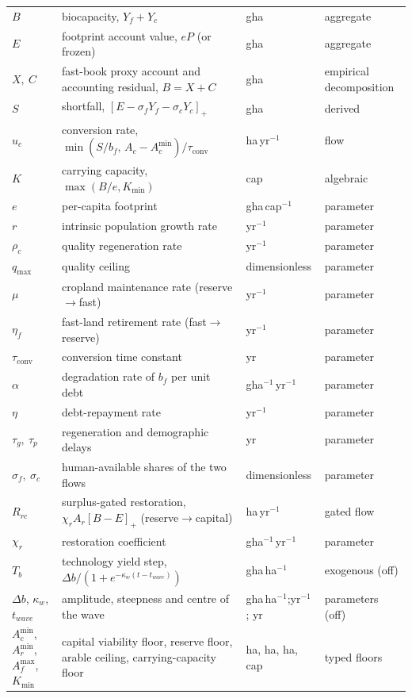 \documentclass[11pt,a4paper]{article}
\newcommand{\pos}[1]{\left[#1\right]_+}
\newcommand{\Acmin}{A_c^{\min}}
\newcommand{\tconv}{\tau_{\mathrm{conv}}}
\begin{document}
\begin{longtable}{>{\raggedright\arraybackslash}p{}>{\raggedright\arraybackslash}p{}>{\raggedright\arraybackslash}p{}>{\raggedright\arraybackslash}p{}}
$B$ & biocapacity, $Y_f+Y_c$ & gha & aggregate \\
$E$ & footprint account value, $eP$ (or frozen) & gha & aggregate \\
$X,\ C$ & fast-book proxy account and accounting residual, $B=X+C$ & gha & empirical decomposition \\
$S$ & shortfall, $\pos{E-\sigma_fY_f-\sigma_cY_c}$ & gha & derived \\
$u_c$ & conversion rate, $\min(S/b_f,\,A_c-\Acmin)/\tconv$ & ha\,yr$^{-1}$ & flow \\
$K$ & carrying capacity, $\max(B/e,K_{\min})$ & cap & algebraic \\
$e$ & per-capita footprint & gha\,cap$^{-1}$ & parameter \\
$r$ & intrinsic population growth rate & yr$^{-1}$ & parameter \\
$\rho_c$ & quality regeneration rate & yr$^{-1}$ & parameter \\
$q_{\max}$ & quality ceiling & dimensionless & parameter \\
$\mu$ & cropland maintenance rate (reserve$\to$fast) & yr$^{-1}$ & parameter \\
$\eta_f$ & fast-land retirement rate (fast$\to$reserve) & yr$^{-1}$ & parameter \\
$\tconv$ & conversion time constant & yr & parameter \\
$\alpha$ & degradation rate of $b_f$ per unit debt & gha$^{-1}$\,yr$^{-1}$ & parameter \\
$\eta$ & debt-repayment rate & yr$^{-1}$ & parameter \\
$\tau_g,\ \tau_p$ & regeneration and demographic delays & yr & parameter \\
$\sigma_f,\ \sigma_c$ & human-available shares of the two flows & dimensionless & parameter \\
$R_{rc}$ & surplus-gated restoration, $\chi_rA_r\pos{B-E}$ (reserve$\to$capital) & ha\,yr$^{-1}$ & gated flow \\
$\chi_r$ & restoration coefficient & gha$^{-1}$\,yr$^{-1}$ & parameter \\
$T_b$ & technology yield step, $\Delta b/(1+e^{-\kappa_w(t-t_{wave})})$ & gha\,ha$^{-1}$ & exogenous (off) \\
$\Delta b$, $\kappa_w$, $t_{wave}$ & amplitude, steepness and centre of the wave & gha\,ha$^{-1}$;\newline yr$^{-1}$; yr & parameters (off) \\
$\Acmin$, $A_r^{\min}$, $A_f^{\max}$, $K_{\min}$ & capital viability floor, reserve floor, arable ceiling, carrying-capacity floor & ha, ha, ha, cap & typed floors \\

\end{longtable}
\end{document}
